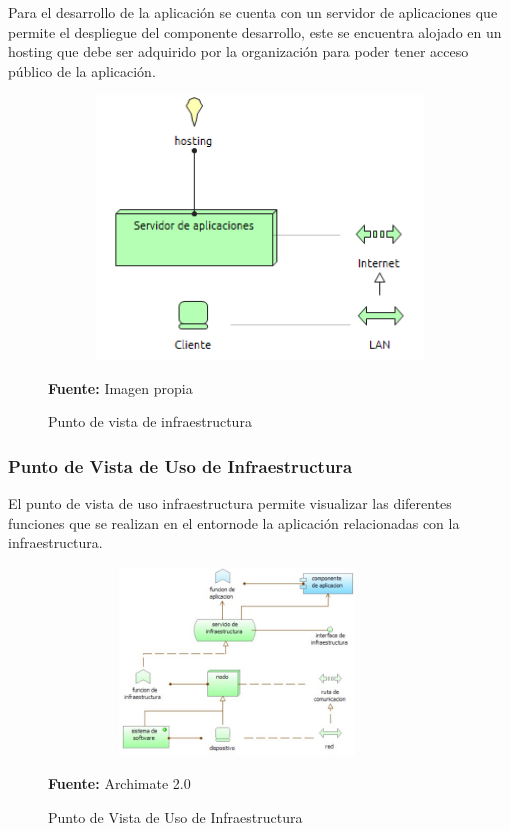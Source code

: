 Para el desarrollo de la aplicación se cuenta con un servidor de aplicaciones que permite el despliegue del componente desarrollo, este se encuentra alojado en un hosting que debe ser adquirido por la organización para poder tener acceso público de la aplicación.

\begin{figure}[th!]
	\centering
	\includegraphics[width=12cm,height=7cm]{arquitectura/tecnologia/imgs/infraestructura}
	\caption{Punto de vista de infraestructura}{\scriptsize \textbf{Fuente:} Imagen propia}
\end{figure}
\newpage

\subsubsection{Punto de Vista de Uso de Infraestructura}

El punto de vista de uso infraestructura permite visualizar las diferentes funciones que se realizan en el entornode la aplicación relacionadas con la infraestructura.


\begin{figure}[th!]
	\centering
	\includegraphics[width=10cm,height=5cm]{arquitectura/tecnologia/imgs/uso-e}
	\caption{Punto de Vista de Uso de Infraestructura}{\scriptsize \textbf{Fuente:} Archimate 2.0 \cite{WEB7}}
\end{figure}

